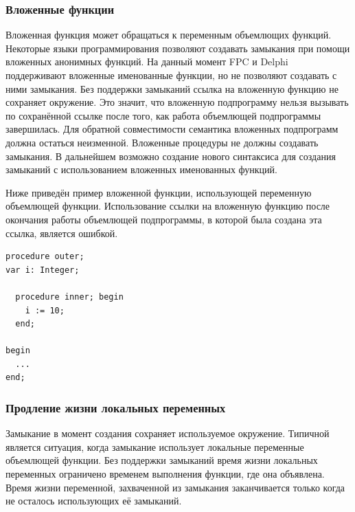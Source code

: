\documentclass{imcs}
\begin{document}
\subsubsection{Вложенные функции}

Вложенная функция может обращаться к переменным объемлющих функций. Некоторые
языки программирования позволяют создавать замыкания при помощи вложенных анонимных
функций. На данный момент FPC и Delphi поддерживают вложенные именованные функции, но
не позволяют создавать с ними замыкания. Без поддержки замыканий ссылка на вложенную
функцию не сохраняет окружение. Это значит, что вложенную подпрограмму нельзя вызывать 
по сохранённой ссылке после того, как работа объемлющей подпрограммы завершилась.
Для обратной совместимости семантика вложенных подпрограмм должна остаться неизменной.
Вложенные процедуры не должны создавать замыкания. В дальнейшем возможно создание
нового синтаксиса для создания замыканий с использованием вложенных именованных функций.

Ниже приведён пример вложенной функции, использующей переменную объемлющей функции.
Использование ссылки на вложенную функцию после окончания работы объемлющей подпрограммы,
в которой была создана эта ссылка, является ошибкой.
\begin{lstlisting}    
procedure outer;
var i: Integer;

  procedure inner; begin
    i := 10;
  end;

begin
  ...
end;    
\end{lstlisting}

\subsubsection{Продление жизни локальных переменных}

Замыкание в момент создания сохраняет используемое окружение.
Типичной является ситуация, когда замыкание использует локальные переменные
объемлющей функции. Без поддержки замыканий время жизни локальных
переменных ограничено временем выполнения функции, где она объявлена.
Время жизни переменной, захваченной из замыкания заканчивается только
когда не осталось использующих её замыканий.
\end{document}
